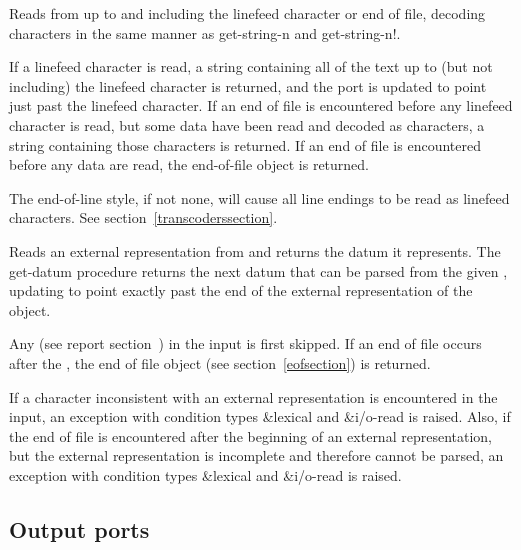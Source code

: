 \begin{entry}{%
}
   
Reads from  up to and including the linefeed
character or end of file, decoding characters in the same manner as
{\cf get-string-n} and {\cf get-string-n!}.
   
If a linefeed character is read, a string
containing all of the text up to (but not including) the linefeed
character is returned, and the port is updated to point just past the
linefeed character. If an end of file is
encountered before any linefeed character is read, but some data
have been read and decoded as characters, a string containing
those characters is returned. If an end of file is encountered before
any data are read, the end-of-file object is
returned.

\begin{note}
  The end-of-line style, if not {\cf none}, will cause all line
  endings to be read as linefeed characters.  See
  section~\ref{transcoderssection}.
\end{note}
\end{entry}

\begin{entry}{%
}
 
Reads an external representation from  and returns the
datum it represents.  The {\cf get-datum} procedure returns the next
datum that can be parsed from the given , updating
 to point exactly past the end of the external
representation of the object.

Any 
(see report section~) in
the input is first skipped.  If an end of file occurs after the
, the end of file object (see
section~\ref{eofsection}) is returned.

If a character inconsistent with an external representation is
encountered in the input, an exception with condition types
{\cf\&lexical} and {\cf\&i/o-read} is raised.
Also, if the end of file is encountered
after the beginning of an external representation, but the external
representation is incomplete and therefore cannot be parsed, an exception
with condition types {\cf\&lexical} and {\cf\&i/o-read} is raised.
\end{entry}

\subsection{Output ports}

